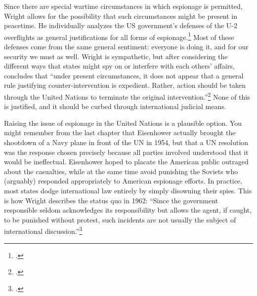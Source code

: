 \documentclass[12pt]{article}
\begin{document}
Since there are special wartime circumstances in which espionage is permitted, Wright allows for the possibility that such circumstances might be present in peacetime. He individually analyzes the US government's defenses of the U-2 overflights as general justifications for all forms of espionage.\footcite[p.~17. A fun question to ask yourself is whether putting human spies and overflights in the same category elevates the severity of human intelligence or minimizes that of overflights. I think it actually does both, and Wright seems to agree. An overflying plane is clearly capable of greater physical destruction but ``the difference should not be exaggerated. Although a reconnaissance airplane may carry bombs, a secret agent may plant a bomb and engage in various forms of sabotage.'' (p. 21) The general lack of concern that a spy plane might be carrying bombs is consistently surprising to me. Many of these flights were in retrofitted bombers, completely indistinguishable to enemies from their heavily-armed counterparts. Nonethless, both sides seem willing to treat reconnaissance flights as their own separate thing, and that protection applies to spies as well. As long as spies \emph{don't} engage in sabotage, the fact that they have the potential to do so is irrelevant.]{wright_espionage_1962} Most of these defenses come from the same general sentiment: everyone is doing it, and for our security we must as well. Wright is sympathetic, but after considering the different ways that states might spy on or interfere with each others' affairs, concludes that ``under present circumstances, it does not appear that a general rule justifying counter-intervention is expedient. Rather, action should be taken through the United Nations to terminate the original intervention.''\footcite[p.~22]{wright_espionage_1962} None of this is justified, and it should be curbed through international judicial means.

Raising the issue of espionage in the United Nations is a plausible option. You might remember from the last chapter that Eisenhower actually brought the shootdown of a Navy plane in front of the UN in 1954, but that a UN resolution was the response chosen precisely because all parties involved understood that it would be ineffectual. Eisenhower hoped to placate the American public outraged about the casualties, while at the same time avoid punishing the Soviets who (arguably) responded appropriately to American espionage efforts. In practice, most states dodge international law entirely by simply disowning their spies. This is how Wright describes the status quo in 1962: ``Since the government responsible \textelp{} seldom acknowledges its responsibility but allows the agent, if caught, to be punished without protest, such incidents are not usually the subject of international discussion.''\footcite[p.~15. As an argument for not invoking international law, I acutally find this a bit silly. Just because a bank robber never flips on their co-conspirators does not mean those co-conspirators cannot be indicted for their role in committing the crime.]{wright_espionage_1962}
\end{document}
